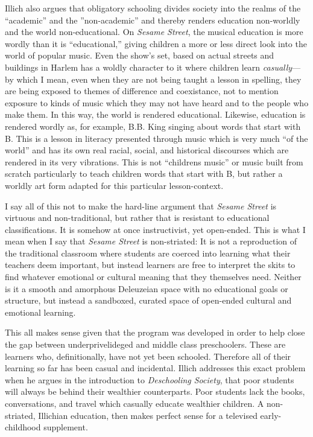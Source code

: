 \documentclass[12pt,letterpaper]{article}
\begin{document}
	Illich also argues that obligatory schooling divides society into the 
	realms of the ``academic'' and the ''non-academic'' and thereby renders
	education non-worldly and the world non-educational.\autocite[12]
	{Illich} On \textit{Sesame Street}, the musical education is more wordly
	than it is ``educational,'' giving children a more or less direct look 
	into the world of popular music. Even the show's set, based on actual
	streets and buildings in Harlem\autocite[154]{Davis} has a
	 woldly character to it where children learn \textit{casually}---by 
	which I mean, even when they are not being taught a lesson in spelling,
	they are being exposed to themes of difference and coexistance, not to 
	mention exposure to kinds of music which they may not have heard 
	and to the people who make them. In this way, the world is rendered 
	educational. Likewise, 
	education is rendered wordly as, for example, B.B. King singing about 
	words that start with B. This is a lesson in literacy presented through
	music which is very much ``of the world'' and has its own real racial, 
	social, and historical discourses which are rendered in its very 
	vibrations. This is not ``childrens music'' or music built from scratch
	particularly to teach children words that start with B, but rather a 
	worldly art form adapted for this particular lesson-context.

	I say all of this not to make the hard-line argument that \textit{Sesame
	Street} is virtuous and non-traditional, but rather that is  
	resistant to educational classifications.
	It is somehow at once instructivist, yet open-ended. This
	is what I mean when I say that \textit{Sesame Street} is non-striated: 
	It is not a reproduction of the traditional classroom where students are
	coerced into learning what their teachers deem important, but instead 
	learners are free to interpret the skits to find whatever emotional or 
	cultural meaning that they themselves need. Neither is it a smooth 
	and amorphous Deleuzeian space with no educational goals or structure, 
	but 
	instead a sandboxed, curated space of open-ended cultural and 
	emotional learning.

	This all makes sense given that the program was developed in order to 
	help close the gap between underprivelideged and middle class 
	preschoolers\autocite[sec. 1]{Cooney}. These are learners who, 
	definitionally, have not yet been schooled. Therefore all of their 
	learning so far has been casual and incidental. Illich addresses this 
	exact problem when he argues in the introduction to \textit{Deschooling
	Society}, that poor students will always be behind their wealthier
	counterparts\autocite[5]{Illich}. Poor students lack the books, 
	conversations, and travel which casually educate wealthier children.
	A non-striated, Illichian education, then makes perfect sense for
	a televised early-childhood supplement.
\end{document}
